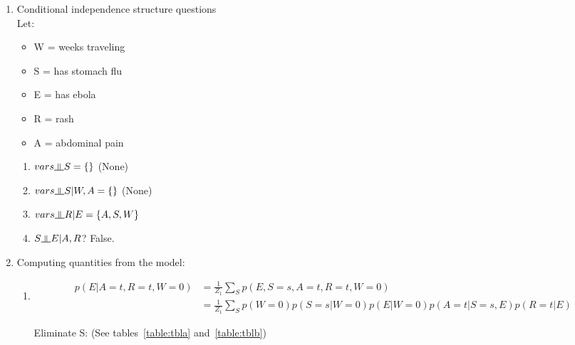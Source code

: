 \documentclass{article}
\newcommand{\indep}{\rotatebox[origin=c]{90}{$\models$}}
\begin{document}
\begin{enumerate}[label=(\alph*)]
\setlength\itemsep{1em}


\item Conditional independence structure questions \\
Let:
\begin{itemize}
\item W = weeks traveling
\item S = has stomach flu
\item E = has ebola
\item R = rash
\item A = abdominal pain

\end{itemize}

\begin{enumerate}[label=\roman*.]


\item $vars \indep S = \{\}$  (None)


\item $vars \indep S | W,A = \{\}$ (None)


\item $vars \indep R | E = \{A,S,W\}$


\item $S \indep E | A,R$? False.

\end{enumerate}


\item Computing quantities from the model: 

\begin{enumerate}[label=\roman*.]


\item 
\begin{align*}
p(E|A=t,R=t,W=0) &= \frac{1}{Z_1}\sum_S p(E,S=s,A=t,R=t,W=0) \\
&= \frac{1}{Z_1}\sum_S p(W=0)p(S=s|W=0)p(E|W=0)p(A=t|S=s,E)p(R=t|E)
\end{align*}

Eliminate S: (See tables~\ref{table:tbla} and~\ref{table:tblb})
 

\end{enumerate}
\end{enumerate}
\end{document}
